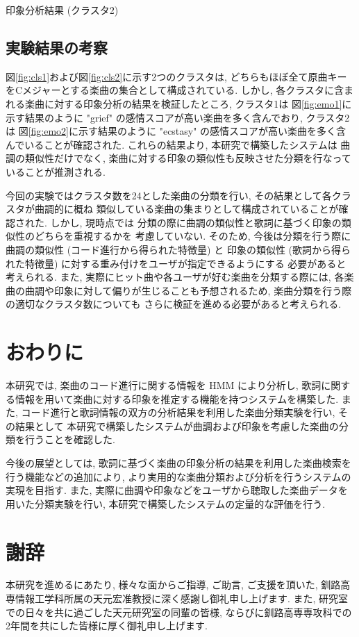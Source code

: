 \documentclass{jpreprint}
\begin{document}
\begin{multicols}{2}
\begin{figurehere}
\begin{center}
  \caption{印象分析結果 (クラスタ2)}
  \label{fig:emo2}
  \end{center}
\end{figurehere}

\subsection{実験結果の考察}
図\ref{fig:cls1}および図\ref{fig:cls2}に示す2つのクラスタは,
どちらもほぼ全て原曲キーをCメジャーとする楽曲の集合として構成されている.
しかし,
各クラスタに含まれる楽曲に対する印象分析の結果を検証したところ,
クラスタ1は
図\ref{fig:emo1}に示す結果のように "grief" の感情スコアが高い楽曲を多く含んでおり,
クラスタ2は
図\ref{fig:emo2}に示す結果のように "ecstasy" の感情スコアが高い楽曲を多く含んでいることが確認された.
これらの結果より,
本研究で構築したシステムは
曲調の類似性だけでなく,
楽曲に対する印象の類似性も反映させた分類を行なっていることが推測される.

今回の実験ではクラスタ数を24とした楽曲の分類を行い,
その結果として各クラスタが曲調的に概ね
類似している楽曲の集まりとして構成されていることが確認された.
しかし,
現時点では
分類の際に曲調の類似性と歌詞に基づく印象の類似性のどちらを重視するかを
考慮していない.
そのため,
今後は分類を行う際に
曲調の類似性 (コード進行から得られた特徴量) と
印象の類似性 (歌詞から得られた特徴量) に対する重み付けをユーザが指定できるようにする
必要があると考えられる.
また, 
実際にヒット曲や各ユーザが好む楽曲を分類する際には,
各楽曲の曲調や印象に対して偏りが生じることも予想されるため,
楽曲分類を行う際の適切なクラスタ数についても
さらに検証を進める必要があると考えられる.

\section{おわりに}
本研究では, 
楽曲のコード進行に関する情報を HMM により分析し,
歌詞に関する情報を用いて楽曲に対する印象を推定する機能を持つシステムを構築した.
また, 
コード進行と歌詞情報の双方の分析結果を利用した楽曲分類実験を行い,
その結果として
本研究で構築したシステムが曲調および印象を考慮した楽曲の分類を行うことを確認した.

今後の展望としては,
歌詞に基づく楽曲の印象分析の結果を利用した楽曲検索を行う機能などの追加により,
より実用的な楽曲分類および分析を行うシステムの実現を目指す.
また,
実際に曲調や印象などをユーザから聴取した楽曲データを用いた分類実験を行い,
本研究で構築したシステムの定量的な評価を行う.

\section{謝辞}
本研究を進めるにあたり,
様々な面からご指導, ご助言, ご支援を頂いた,
釧路高専情報工学科所属の天元宏准教授に深く感謝し御礼申し上げます.
また, 
研究室での日々を共に過ごした天元研究室の同輩の皆様,
ならびに釧路高専専攻科での2年間を共にした皆様に厚く御礼申し上げます.


\end{multicols}
\end{document}
